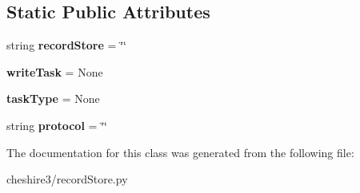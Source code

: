 \subsection*{Static Public Attributes}
\begin{DoxyCompactItemize}
\item 
\hypertarget{classcheshire3_1_1record_store_1_1_remote_slave_record_store_aa6e115ea88fbe8cc21effa4d00a473f7}{string {\bfseries record\-Store} = \char`\"{}\char`\"{}}\label{classcheshire3_1_1record_store_1_1_remote_slave_record_store_aa6e115ea88fbe8cc21effa4d00a473f7}

\item 
\hypertarget{classcheshire3_1_1record_store_1_1_remote_slave_record_store_a710a4c2fb4084263e1e9ac5c44dccc95}{{\bfseries write\-Task} = None}\label{classcheshire3_1_1record_store_1_1_remote_slave_record_store_a710a4c2fb4084263e1e9ac5c44dccc95}

\item 
\hypertarget{classcheshire3_1_1record_store_1_1_remote_slave_record_store_a31ce483fb446371d23def92308f7e4b3}{{\bfseries task\-Type} = None}\label{classcheshire3_1_1record_store_1_1_remote_slave_record_store_a31ce483fb446371d23def92308f7e4b3}

\item 
\hypertarget{classcheshire3_1_1record_store_1_1_remote_slave_record_store_ab051b22d042f5ff4e3c5e1351b4beb06}{string {\bfseries protocol} = \char`\"{}\char`\"{}}\label{classcheshire3_1_1record_store_1_1_remote_slave_record_store_ab051b22d042f5ff4e3c5e1351b4beb06}

\end{DoxyCompactItemize}


The documentation for this class was generated from the following file\-:\begin{DoxyCompactItemize}
\item 
cheshire3/record\-Store.\-py\end{DoxyCompactItemize}
